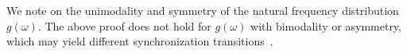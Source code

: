 
We note on the unimodality and symmetry of the natural frequency distribution $g(\omega)$.
The above proof does not hold for $g(\omega)$ with bimodality or asymmetry,
which may yield different synchronization transitions~\cite{martens2009,terada2017,yoneda2019}.


